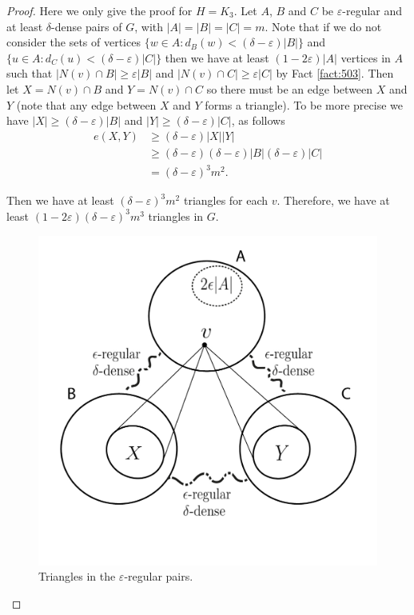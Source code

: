 \documentclass[12pt,twoside,a4paper,bibliography=totocnumbered]{book}
\numberwithin{equation}{section}
\theoremstyle{remark}
\begin{document}
\begin{proof}
Here we only give the proof for $H=K_3$. Let %
 $A$, $B$ and $C$ be $\varepsilon$-regular and at least $\delta$-dense pairs of $G$, with $|A|=|B|=|C|=m$. Note that if we do not consider the sets of vertices $\{w\in A \colon d_B(w) < (\delta - \varepsilon)|B| \}$  and $\{u\in A \colon d_C(u) < (\delta - \varepsilon)|C| \}$ then we have at least $(1-2\varepsilon)|A|$ vertices in $A$ such that $|N(v) \cap B| \geq \varepsilon |B|$ and $|N(v) \cap C| \geq \varepsilon |C|$ by Fact \ref{fact:503}. Then let $X = N(v) \cap B$ and $Y =N(v) \cap C$ so there must be an edge between $X$ and $Y$ (note that any edge between $X$ and $Y$ forms a triangle). To be more precise we have $|X| \geq (\delta - \varepsilon)|B|$ and $|Y| \geq (\delta - \varepsilon)|C|$, as follows
\begin{align*}
e(X,Y) &\geq (\delta - \varepsilon)|X||Y|\\
& \geq (\delta - \varepsilon)  (\delta - \varepsilon)|B|  (\delta - \varepsilon)|C|\\
& =  (\delta - \varepsilon)^3 m^2.
\end{align*}

Then we have at least $ (\delta - \varepsilon)^3 m^2$ triangles for each $v$. Therefore, we have at least $(1-2\varepsilon) (\delta-\varepsilon)^3 m^3$ triangles in $G$. 

\begin{figure}[H]
     \centering
     \includegraphics[scale=1]{Figuras/embedding-lemma.jpg}
     \caption{Triangles in the $\varepsilon$-regular pairs.}
     \label{fig:embeddinglemma}
\end{figure}

\end{proof}
\end{document}
